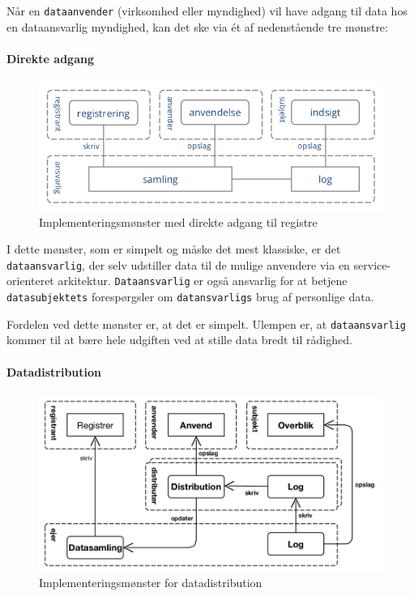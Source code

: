 Når en \texttt{dataanvender} (virksomhed eller myndighed) vil have
adgang til data hos en dataansvarlig myndighed, kan det ske via ét af
nedenstående tre mønstre:

\paragraph{Direkte adgang}\label{direkte-adgang}

\begin{figure}
\centering
\includegraphics{figures/use-direct.png}
\caption{Implementeringsmønster med direkte adgang til registre}
\end{figure}

I dette mønster, som er simpelt og måske det mest klassiske, er det
\texttt{dataansvarlig}, der selv udstiller data til de mulige anvendere
via en service-orienteret arkitektur. \texttt{Dataansvarlig} er også
ansvarlig for at betjene \texttt{datasubjektets} forespørgsler om
\texttt{datansvarligs} brug af personlige data.

Fordelen ved dette mønster er, at det er simpelt. Ulempen er, at
\texttt{dataansvarlig} kommer til at bære hele udgiften ved at stille
data bredt til rådighed.

\paragraph{Datadistribution}\label{datadistribution}

\begin{figure}
\centering
\includegraphics{figures/use-dist.png}
\caption{Implementeringsmønster for datadistribution}
\end{figure}


